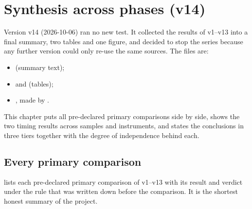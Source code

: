 \chapter{Synthesis across phases (v14)}\label{ch:synthesis}
Version v14 (2026-10-06) ran no new test. It collected the results of v1--v13 into a final summary, two tables and one figure, and
decided to stop the series because any further version could only re-use the same sources. The files are:
\begin{itemize}
\item {} (summary text);
\item {} and  (tables);
\item {}, made by .
\end{itemize} This chapter puts all pre-declared primary comparisons side by side,
shows the two timing results across samples and instruments, and states the conclusions in three tiers together with the degree of
independence behind each.

\section{Every primary comparison}\label{sec:synthprimaries}
 lists each pre-declared primary comparison of v1--v13 with its result and verdict under the rule that was
written down before the comparison. It is the shortest honest summary of the project.

